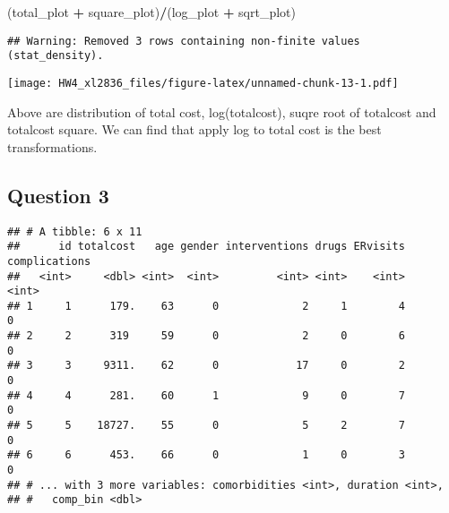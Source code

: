 \documentclass[]{article}
\newenvironment{Shaded}{\begin{snugshade}}{\end{snugshade}}
\newcommand{\KeywordTok}[1]{\textcolor[rgb]{0.13,0.29,0.53}{\textbf{#1}}}
\newcommand{\DataTypeTok}[1]{\textcolor[rgb]{0.13,0.29,0.53}{#1}}
\newcommand{\DecValTok}[1]{\textcolor[rgb]{0.00,0.00,0.81}{#1}}
\newcommand{\FloatTok}[1]{\textcolor[rgb]{0.00,0.00,0.81}{#1}}
\newcommand{\StringTok}[1]{\textcolor[rgb]{0.31,0.60,0.02}{#1}}
\newcommand{\OperatorTok}[1]{\textcolor[rgb]{0.81,0.36,0.00}{\textbf{#1}}}
\newcommand{\NormalTok}[1]{#1}
\begin{document}
\begin{Shaded}
\begin{Highlighting}[]
\NormalTok{(total_plot }\OperatorTok{+}\StringTok{ }\NormalTok{square_plot)}\OperatorTok{/}\NormalTok{(log_plot }\OperatorTok{+}\StringTok{ }\NormalTok{sqrt_plot)}
\end{Highlighting}
\end{Shaded}

\begin{verbatim}
## Warning: Removed 3 rows containing non-finite values (stat_density).
\end{verbatim}

\texttt{[image: HW4\_xl2836\_files/figure-latex/unnamed-chunk-13-1.pdf]}

Above are distribution of total cost, log(totalcost), suqre root of
totalcost and totalcost square. We can find that apply log to total cost
is the best transformations.

\subsection{Question 3}\label{question-3}

\begin{Shaded}
\end{Shaded}

\begin{verbatim}
## # A tibble: 6 x 11
##      id totalcost   age gender interventions drugs ERvisits complications
##   <int>     <dbl> <int>  <int>         <int> <int>    <int>         <int>
## 1     1      179.    63      0             2     1        4             0
## 2     2      319     59      0             2     0        6             0
## 3     3     9311.    62      0            17     0        2             0
## 4     4      281.    60      1             9     0        7             0
## 5     5    18727.    55      0             5     2        7             0
## 6     6      453.    66      0             1     0        3             0
## # ... with 3 more variables: comorbidities <int>, duration <int>,
## #   comp_bin <dbl>
\end{verbatim}
\end{document}
